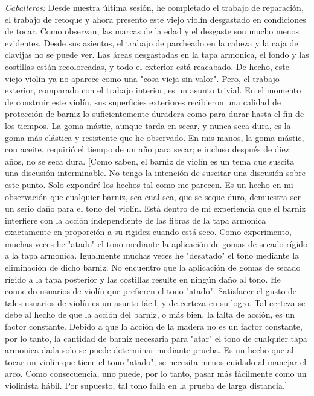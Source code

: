 \documentclass[12pt]{book}
\begin{document}
\textit{Caballeros:} Desde nuestra última sesión, he completado el trabajo de reparación, el trabajo de retoque y ahora presento este viejo violín desgastado en condiciones de tocar. Como observan, las marcas de la edad y el desgaste son mucho menos evidentes. Desde sus asientos, el trabajo de parcheado en la cabeza y la caja de clavijas no se puede ver. Las áreas desgastadas en la tapa armonica, el fondo y las costillas están recoloreadas, y todo el exterior está reacabado. De hecho, este viejo violín ya no aparece como una "cosa vieja sin valor". Pero, el trabajo exterior, comparado con el trabajo interior, es un asunto trivial. En el momento de construir este violín, sus superficies exteriores recibieron una calidad de protección de barniz lo suficientemente duradera como para durar hasta el fin de los tiempos. La goma mástic, aunque tarda en secar, y nunca seca dura, es la goma más elástica y resistente que he observado. En mis manos, la goma mástic, con aceite, requirió el tiempo de un año para secar; e incluso después de diez años, no se seca dura. [Como saben, el barniz de violín es un tema que suscita una discusión interminable. No tengo la intención de suscitar una discusión sobre este punto. Solo expondré los hechos tal como me parecen. Es un hecho en mi observación que cualquier barniz, sea cual sea, que se seque duro, demuestra ser un serio daño para el tono del violín. Está dentro de mi experiencia que el barniz interfiere con la acción independiente de las fibras de la tapa armonica exactamente en proporción a su rigidez cuando está seco. Como experimento, muchas veces he "atado" el tono mediante la aplicación de gomas de secado rígido a la tapa armonica. Igualmente muchas veces he "desatado" el tono mediante la eliminación de dicho barniz. No encuentro que la aplicación de gomas de secado rígido a la tapa posterior y las costillas resulte en ningún daño al tono. He conocido usuarios de violín que prefieren el tono "atado". Satisfacer el gusto de tales usuarios de violín es un asunto fácil, y de certeza en su logro. Tal certeza se debe al hecho de que la acción del barniz, o más bien, la falta de acción, es un factor constante. Debido a que la acción de la madera no es un factor constante, por lo tanto, la cantidad de barniz necesaria para "atar" el tono de cualquier tapa armonica dada solo se puede determinar mediante prueba. Es un hecho que al tocar un violín que tiene el tono "atado", se necesita menos cuidado al manejar el arco. Como consecuencia, uno puede, por lo tanto, pasar más fácilmente como un violinista hábil. Por supuesto, tal tono falla en la prueba de larga distancia.]
\end{document}
